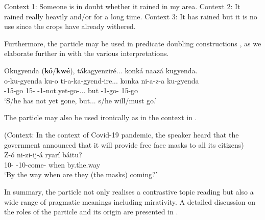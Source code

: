 \documentclass[output=paper]{langscibook}
\begin{document}
\settowidth\jamwidth{[depreciative]}
\sn
Context 1: Someone is in doubt whether it rained in my area. \jambox*{[verum]{\footnotemark}}
\sn
Context 2: It rained really heavily and/or for a long time. \jambox*{[intensity]}
\sn
Context 3: It has rained but it is no use since the crops have already withered. \jambox*{[depreciative]}

\z

Furthermore, the particle may be used in predicate doubling constructions , as we elaborate further in  with the various interpretations.

\ea
\label{bkm:Ref136338129}
Okugyenda (\textbf{kó}/\textbf{kwé}), tákagyenziré... konká naazá kugyenda.\\
\gll
o-ku-gyenda  ku-o  ti-a-ka-gyend-ire...  konka  ni-a-z-a  ku-gyenda\\
\AUG{}-15-go  15-\CM{}  \NEG{}-1\SM{}-not.yet-go-\PFV{}...  but  \IPFV{}-1\SM{}-go-\FV{}  15-go\\
\glt
‘S/he has not yet gone, but... s/he will/must go.’\\


\z


The particle may also be used ironically as in the context in .

\ea
\label{bkm:Ref113717991}
(Context: In the context of Covid-19 pandemic, the speaker heard that the government announced that it will provide free face masks to all its citizens)\\
\gll
Z-ó  ni-zi-ij-á  ryarí  báitu?\\
10-\CM{}  \IPFV{}-10-come-\FV{}  when  by.the.way\\
\glt
`By the way when are they (the masks) coming?’\\


\z

In summary, the particle not only realises a contrastive topic reading but also a wide range of pragmatic meanings including mirativity. A detailed discussion on the roles of the particle and its origin are presented in \citet{AsiimwevanderWal2021}.
\end{document}
